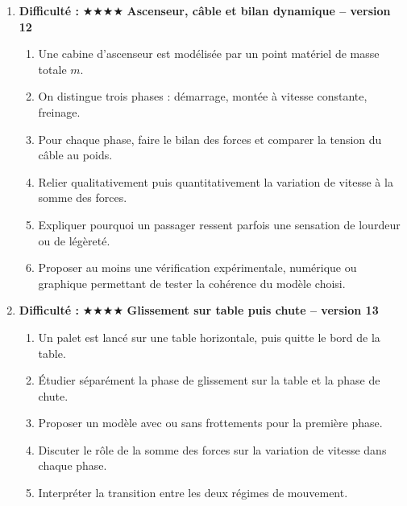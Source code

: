 \documentclass[11pt,a4paper]{article}
\newcommand{\etoiles}[1]{\textbf{Difficulté : }#1}
\begin{document}
\begin{enumerate}[label=\textbf{Problème long \arabic*.},leftmargin=*]
\begin{enumerate}[label=\alph*)]
\item On veut proposer une méthode de cartographie qualitative du champ électrostatique créé dans leur voisinage.
\item Décrire un protocole expérimental raisonnable.
\item Préciser ce que signifient les lignes de champ, les régions où elles sont serrées et le lien avec les forces subies par une charge test.
\item Discuter les limites du modèle de charge ponctuelle dans cette expérience.
\item Proposer au moins une vérification expérimentale, numérique ou graphique permettant de tester la cohérence du modèle choisi.
\end{enumerate}
\item \etoiles{★★★★}
\textbf{Ascenseur, câble et bilan dynamique -- version 12}
\begin{enumerate}[label=\alph*)]
\item Une cabine d'ascenseur est modélisée par un point matériel de masse totale $m$.
\item On distingue trois phases : démarrage, montée à vitesse constante, freinage.
\item Pour chaque phase, faire le bilan des forces et comparer la tension du câble au poids.
\item Relier qualitativement puis quantitativement la variation de vitesse à la somme des forces.
\item Expliquer pourquoi un passager ressent parfois une sensation de lourdeur ou de légèreté.
\item Proposer au moins une vérification expérimentale, numérique ou graphique permettant de tester la cohérence du modèle choisi.
\end{enumerate}
\item \etoiles{★★★★}
\textbf{Glissement sur table puis chute -- version 13}
\begin{enumerate}[label=\alph*)]
\item Un palet est lancé sur une table horizontale, puis quitte le bord de la table.
\item Étudier séparément la phase de glissement sur la table et la phase de chute.
\item Proposer un modèle avec ou sans frottements pour la première phase.
\item Discuter le rôle de la somme des forces sur la variation de vitesse dans chaque phase.
\item Interpréter la transition entre les deux régimes de mouvement.

\end{enumerate}
\end{enumerate}
\end{document}
